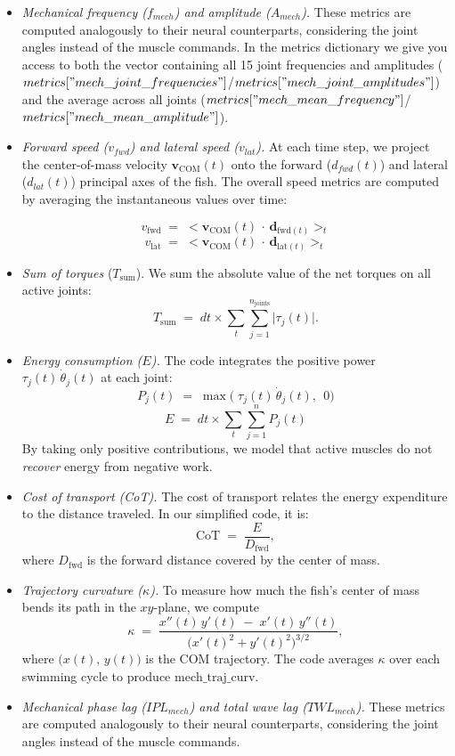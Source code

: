 \documentclass{cmc}
\begin{document}
\begin{itemize}
  \item \textit{Mechanical frequency ($f_{mech}$) and amplitude ($A_{mech}$).}
  These metrics are computed analogously to their neural counterparts, considering the joint angles instead of the muscle commands. In the metrics dictionary we give you access to both the vector containing all 15 joint frequencies and amplitudes ($metrics["mech\_joint\_frequencies"]$/$metrics["mech\_joint\_amplitudes"]$) and the average across all joints ($metrics["mech\_mean\_frequency"]$/$metrics["mech\_mean\_amplitude"]$).


  \item \textit{Forward speed ($v_{fwd}$) and lateral speed ($v_{lat}$).}
  At each time step, we project the center-of-mass velocity \(\mathbf{v}_{\mathrm{COM}}(t)\) onto the forward ($d_{fwd}(t)$) and lateral ($d_{lat}(t)$) principal axes of the fish.
  The overall speed metrics are computed by averaging the instantaneous values over time:

  \[
    v_{\mathrm{fwd}} \;=\; <\mathbf{v}_{\mathrm{COM}}(t)\,\cdot\,\mathbf{d} _{\mathrm{fwd}(t)} >_t
  \]
  \[
    v_{\mathrm{lat}} \;=\; <\mathbf{v}_{\mathrm{COM}}(t)\,\cdot\,\mathbf{d}_{\mathrm{lat}(t)} >_t
  \]

  \item \textit{Sum of torques} (\(T_{\mathrm{sum}}\)).
  We sum the absolute value of the net torques on all active joints:
  \[
    T_{\mathrm{sum}} \;=\; dt \times \sum_{t}\sum_{j=1}^{n_\mathrm{joints}} \bigl|\tau_j(t) \bigr|.
  \]

  \item \textit{Energy consumption (\(E\)).}
  The code integrates the positive power \(\tau_j(t)\,\dot{\theta}_j(t)\) at each joint:
  \[
    P_j(t) \;=\;\max\bigl( \; \tau_j(t)\,\dot{\theta}_j(t),\, \;0 \bigr)
  \]
  \[
    E \;=\;  dt \times \sum_{t} \sum_{j=1}^{n} P_j(t)
  \]
  By taking only positive contributions, we model that active muscles do not \emph{recover} energy from negative work.

  \item \textit{Cost of transport (CoT).}
  The cost of transport relates the energy expenditure to the distance traveled. In our simplified code, it is:
  \[
    \text{CoT} \;=\;\frac{E}{D_{\mathrm{fwd}}},
  \]
  where \(D_{\mathrm{fwd}}\) is the forward distance covered by the center of mass.

  \item \textit{Trajectory curvature (\(\kappa\)).}
  To measure how much the fish’s center of mass bends its path in the \(xy\)-plane, we compute
  \[
    \kappa \;=\;\frac{x''(t)\,y'(t)\;-\;x'(t)\,y''(t)}{\bigl(x'(t)^2 + y'(t)^2\bigr)^{3/2}},
  \]
  where \(\bigl(x(t),\,y(t)\bigr)\) is the COM trajectory. The code averages \(\kappa\) over each swimming cycle to produce \(\text{mech\_traj\_curv}\).

  \item \textit{Mechanical phase lag ($IPL_{mech}$) and total wave lag ($TWL_{mech}$).}
  These metrics are computed analogously to their neural counterparts, considering the joint angles instead of the muscle commands.

\end{itemize}
\end{document}
